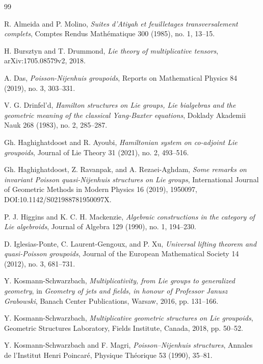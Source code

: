 \documentclass{article}
\begin{document}
\vspace{1cm}
\begin{thebibliography}{99}

R. Almeida and P. Molino,
\textit{Suites d'Atiyah et feuilletages transversalement complets},
Comptes Rendus Math\'ematique 300 (1985), no. 1, 13--15.

H. Bursztyn and T. Drummond,
\textit{Lie theory of multiplicative tensors},
arXiv:1705.08579v2, 2018.

A. Das,
\textit{Poisson-Nijenhuis groupoids},
Reports on Mathematical Physics 84 (2019), no. 3, 303--331.

V. G. Drinfel'd,
\textit{Hamilton structures on Lie groups, Lie bialgebras and the geometric meaning of the classical Yang-Baxter equations},
Doklady Akademii Nauk 268 (1983), no. 2, 285--287.

Gh. Haghighatdoost and R. Ayoubi,
\textit{Hamiltonian system on co-adjoint Lie groupoids},
Journal of Lie Theory 31 (2021), no. 2, 493--516.

Gh. Haghighatdoost, Z. Ravanpak, and A. Rezaei-Aghdam,
\textit{Some remarks on invariant Poisson quasi-Nijenhuis structures on Lie groups},
International Journal of Geometric Methods in Modern Physics 16 (2019), 1950097,
DOI:10.1142/S021988781950097X.

P. J. Higgins and K. C. H. Mackenzie,
\textit{Algebraic constructions in the category of Lie algebroids},
Journal of Algebra 129 (1990), no. 1, 194--230.

D. Iglesias-Ponte, C. Laurent-Gengoux, and P. Xu,
\textit{Universal lifting theorem and quasi-Poisson groupoids},
Journal of the European Mathematical Society 14 (2012), no. 3, 681--731.

Y. Kosmann-Schwarzbach,
\textit{Multiplicativity, from Lie groups to generalized geometry},
in \textit{Geometry of jets and fields, in honour of Professor Janusz Grabowski},
Banach Center Publications, Warsaw, 2016, pp. 131--166.

Y. Kosmann-Schwarzbach,
\textit{Multiplicative geometric structures on Lie groupoids},
Geometric Structures Laboratory, Fields Institute, Canada, 2018, pp. 50--52.

Y. Kosmann-Schwarzbach and F. Magri,
\textit{Poisson–Nijenhuis structures},
Annales de l'Institut Henri Poincar\'e, Physique Th\'eorique 53 (1990), 35--81.


\end{thebibliography}
\end{document}
